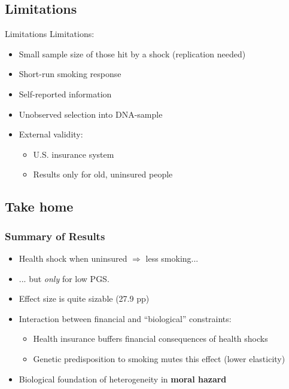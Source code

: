 \documentclass[10pt,compress,xcolor=dvipsnames,aspectratio=169]{beamer}    %
\newcounter{ex}
\newcommand{\1}[1]{\mathrm{1\hspace*{-2.5pt}l}[#1]}	%
\begin{document}
\subsection{Limitations}
\begin{frame}{Limitations} \label{frame:limit}
Limitations:
\begin{itemize}
	\item Small sample size of those hit by a shock (replication needed) \hyperlink{frame:sumstats2}{}
	\item Short-run smoking response
	\item Self-reported information
	\item Unobserved selection into DNA-sample

	\vspace{3ex}
	\item External validity:
	\begin{itemize}
		\item U.S. insurance system
		\item Results only for old, uninsured people \hyperlink{frame:uninsured}{}
	\end{itemize}
\end{itemize}
\end{frame}

\subsection{Take home}
\begin{frame} \frametitle{Summary of Results}
\begin{itemize}
	\item Health shock when uninsured $\Rightarrow$ less smoking...
	\item ... but \textit{only} for low PGS.
	\item Effect size is quite sizable (27.9 pp)

	\vspace{3ex}

	\item Interaction between financial and ``biological'' constraints:
	\begin{itemize}
		\item Health insurance buffers financial consequences of health shocks
		\item Genetic predisposition to smoking mutes this effect (lower elasticity)
	\end{itemize}

	\vspace{3ex}

	\item Biological foundation of heterogeneity in \textbf{moral hazard} \cite{Einav2013}
\end{itemize}
\end{frame}
\end{document}
